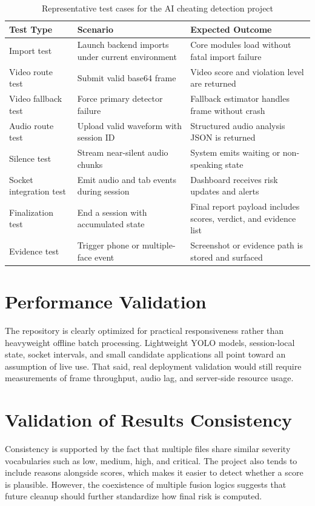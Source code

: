 \documentclass[12pt,a4paper]{extreport}
\begin{document}
\begin{table}[H]
\centering
\caption{Representative test cases for the AI cheating detection project}
\label{tab:test_cases_project}
\begin{tabularx}{\textwidth}{p{2.5cm}p{4.4cm}X}
\toprule
\textbf{Test Type} & \textbf{Scenario} & \textbf{Expected Outcome}\\
\midrule
Import test & Launch backend imports under current environment & Core modules load without fatal import failure\\
Video route test & Submit valid base64 frame & Video score and violation level are returned\\
Video fallback test & Force primary detector failure & Fallback estimator handles frame without crash\\
Audio route test & Upload valid waveform with session ID & Structured audio analysis JSON is returned\\
Silence test & Stream near-silent audio chunks & System emits waiting or non-speaking state\\
Socket integration test & Emit audio and tab events during session & Dashboard receives risk updates and alerts\\
Finalization test & End a session with accumulated state & Final report payload includes scores, verdict, and evidence list\\
Evidence test & Trigger phone or multiple-face event & Screenshot or evidence path is stored and surfaced\\
\bottomrule
\end{tabularx}
\end{table}

\section{Performance Validation}
The repository is clearly optimized for practical responsiveness rather than heavyweight offline batch processing. Lightweight YOLO models, session-local state, socket intervals, and small candidate applications all point toward an assumption of live use. That said, real deployment validation would still require measurements of frame throughput, audio lag, and server-side resource usage.

\section{Validation of Results Consistency}
Consistency is supported by the fact that multiple files share similar severity vocabularies such as low, medium, high, and critical. The project also tends to include reasons alongside scores, which makes it easier to detect whether a score is plausible. However, the coexistence of multiple fusion logics suggests that future cleanup should further standardize how final risk is computed.
\end{document}
